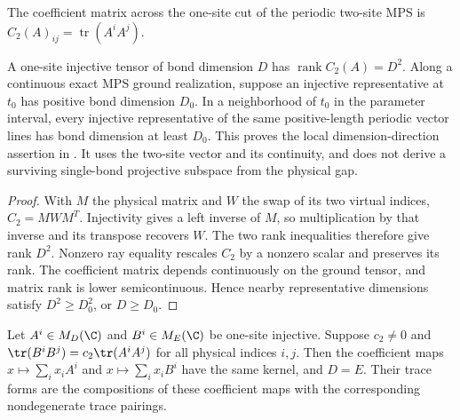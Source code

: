 \begin{definition}
    \label{def:spt_two_site_schmidt_matrix}
    \leanok
    The coefficient matrix across the one-site cut of the periodic
    two-site MPS is $C_2(A)_{ij}=\operatorname{tr}(A^iA^j)$.
\end{definition}

\begin{lemma}
    \label{thm:spt_minimal_bond_dimension_lower_bound}
    \leanok
    A one-site injective tensor of bond dimension $D$ has
    $\operatorname{rank}C_2(A)=D^2$. Along a continuous exact MPS ground
    realization, suppose an injective representative at $t_0$ has
    positive bond dimension $D_0$. In a neighborhood of $t_0$ in the
    parameter interval, every injective representative of the same
    positive-length periodic vector lines has bond dimension at least
    $D_0$. This proves the local dimension-direction assertion in
    \cite[Section~II.F.2, lines~1059--1068]{Schuch2011Phases}.
    It uses the two-site vector and its continuity, and does not derive
    a surviving single-bond projective subspace from the physical gap.
\end{lemma}

\begin{proof}\leanok
    With $M$ the physical matrix and $W$ the swap of its two virtual
    indices, $C_2=MWM^T$. Injectivity gives a left inverse of $M$,
    so multiplication by that inverse and its transpose recovers $W$.
    The two rank inequalities therefore give rank $D^2$.
    Nonzero ray equality rescales $C_2$ by a nonzero scalar and preserves
    its rank. The coefficient matrix depends continuously on the
    ground tensor, and matrix rank is lower semicontinuous. Hence nearby
    representative dimensions satisfy $D^2\ge D_0^2$, or $D\ge D_0$.
\end{proof}

\begin{lemma}
    \label{thm:spt_finite_two_site_trace_quotient}
    \leanok
    Let $A^i\in M_D(\C)$ and $B^i\in M_E(\C)$ be one-site injective.
    Suppose $c_2\ne0$ and
    $\tr(B^iB^j)=c_2\tr(A^iA^j)$ for all physical indices $i,j$.
    Then the coefficient maps $x\mapsto\sum_i x_iA^i$ and
    $x\mapsto\sum_i x_iB^i$ have the same kernel, and $D=E$.
    Their trace forms are the compositions of these coefficient maps
    with the corresponding nondegenerate trace pairings.
\end{lemma}

